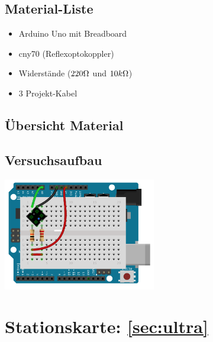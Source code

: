 \margininfo{}
\begin{multicols}{2}
\subsection*{Material-Liste}
\begin{itemize}
  \item Arduino Uno mit Breadboard
  \item cny70 (Reflexoptokoppler)
  \item Widerstände ($220\Omega$ und $10k\Omega$)
  \item 3 Projekt-Kabel
\end{itemize}

\subsection*{Übersicht Material}

\vfill\null 
\columnbreak

\subsection*{Versuchsaufbau}

\includegraphics[width=0.5\textwidth]{Kapitel2/Bilder/cny70bb}
\end{multicols}


\section*{Stationskarte: \ref{sec:ultra} }

